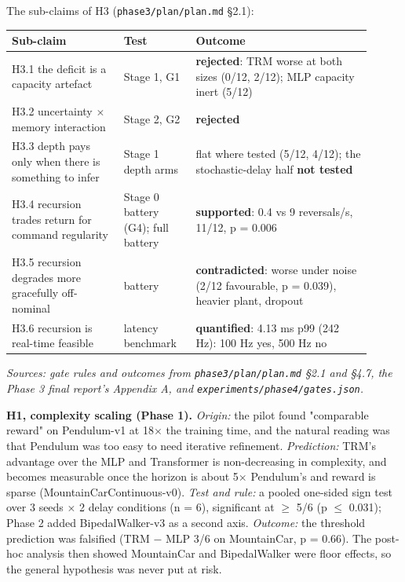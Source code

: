 \documentclass[11pt]{article}
\begin{document}
The sub-claims of H3 (\texttt{phase3/\allowbreak{}plan/\allowbreak{}plan.\allowbreak{}md} \S{}2.1):



\begin{center}\small\begin{tabular}{>{\raggedright\arraybackslash}p{0.281\linewidth}>{\raggedright\arraybackslash}p{0.180\linewidth}>{\raggedright\arraybackslash}p{0.445\linewidth}}
\toprule
Sub-claim & Test & Outcome \\
\midrule
H3.1 the deficit is a capacity artefact & Stage 1, G1 & \textbf{rejected}: TRM worse at both sizes (0/12, 2/12); MLP capacity inert (5/12) \\
H3.2 uncertainty $\times$ memory interaction & Stage 2, G2 & \textbf{rejected} \\
H3.3 depth pays only when there is something to infer & Stage 1 depth arms & flat where tested (5/12, 4/12); the stochastic-delay half \textbf{not tested} \\
H3.4 recursion trades return for command regularity & Stage 0 battery (G4); full battery & \textbf{supported}: 0.4 vs 9 reversals/s, 11/12, p = 0.006 \\
H3.5 recursion degrades more gracefully off-nominal & battery & \textbf{contradicted}: worse under noise (2/12 favourable, p = 0.039), heavier plant, dropout \\
H3.6 recursion is real-time feasible & latency benchmark & \textbf{quantified}: 4.13 ms p99 (242 Hz): 100 Hz yes, 500 Hz no \\
\bottomrule
\end{tabular}\end{center}



\emph{Sources: gate rules and outcomes from \texttt{phase3/\allowbreak{}plan/\allowbreak{}plan.\allowbreak{}md} \S{}2.1 and \S{}4.7, the Phase 3 final report's Appendix A, and \texttt{experiments/\allowbreak{}phase4/\allowbreak{}gates.\allowbreak{}json}.}



\textbf{H1, complexity scaling (Phase 1).} \emph{Origin:} the pilot found "comparable reward" on Pendulum-v1 at 18$\times$ the training time, and the natural reading was that Pendulum was too easy to need iterative refinement. \emph{Prediction:} TRM's advantage over the MLP and Transformer is non-decreasing in complexity, and becomes measurable once the horizon is about 5$\times$ Pendulum's and reward is sparse (MountainCarContinuous-v0). \emph{Test and rule:} a pooled one-sided sign test over 3 seeds $\times$ 2 delay conditions (n = 6), significant at $\geq$ 5/6 (p $\leq$ 0.031); Phase 2 added BipedalWalker-v3 as a second axis. \emph{Outcome:} the threshold prediction was falsified (TRM $-$ MLP 3/6 on MountainCar, p = 0.66). The post-hoc analysis then showed MountainCar and BipedalWalker were floor effects, so the general hypothesis was never put at risk.
\end{document}
